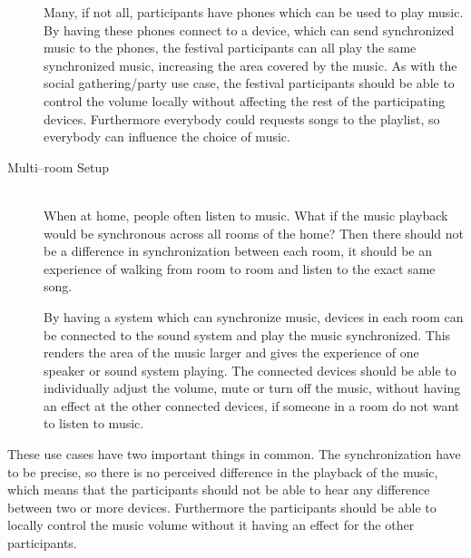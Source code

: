 \begin{description}
        Many, if not all, participants have phones which can be used to play music.
        By having these phones connect to a device, which can send synchronized music to the phones,
        the festival participants can all play the same synchronized music,
        increasing the area covered by the music.
        As with the social gathering/party use case,
        the festival participants should be able to control the volume locally without affecting the rest of the participating devices.
        Furthermore everybody could requests songs to the playlist, so everybody can influence the choice of music.

    \item[Multi--room Setup] \hfill\\
        When at home, people often listen to music.
        What if the music playback would be synchronous across all rooms of the home?
        Then there should not be a difference in synchronization between each room,
        it should be an experience of walking from room to room and listen to the exact same song.

        By having a system which can synchronize music, devices in each room can be connected to the sound system and play the music synchronized.
        This renders the area of the music larger and gives the experience of one speaker or sound system playing.
        The connected devices should be able to individually adjust the volume, mute or turn off the music,
        without having an effect at the other connected devices, if someone in a room do not want to listen to music.
\end{description}

These use cases have two important things in common.
The synchronization have to be precise, so there is no perceived difference in the playback of the music,
which means that the participants should not be able to hear any difference between two or more devices.
Furthermore the participants should be able to locally control the music volume without it having an effect for the other participants.
